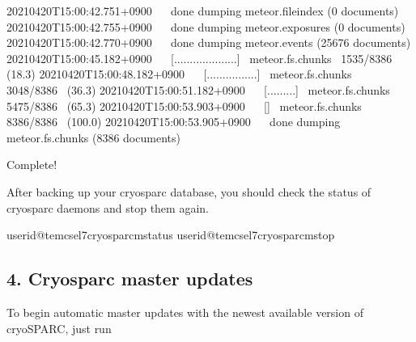 \documentclass[a4paper,10pt,english]{sphinxmanual}
\begin{document}
\begin{sphinxVerbatim}[commandchars=\\\{\}]
2021\PYGZhy{}04\PYGZhy{}20T15:00:42.751+0900    done dumping meteor.file\PYGZus{}index (0 documents)
2021\PYGZhy{}04\PYGZhy{}20T15:00:42.755+0900    done dumping meteor.exposures (0 documents)
2021\PYGZhy{}04\PYGZhy{}20T15:00:42.770+0900    done dumping meteor.events (25676 documents)
2021\PYGZhy{}04\PYGZhy{}20T15:00:45.182+0900    [\PYGZsh{}\PYGZsh{}\PYGZsh{}\PYGZsh{}....................]  meteor.fs.chunks  1535/8386  (18.3\PYGZpc{})
2021\PYGZhy{}04\PYGZhy{}20T15:00:48.182+0900    [\PYGZsh{}\PYGZsh{}\PYGZsh{}\PYGZsh{}\PYGZsh{}\PYGZsh{}\PYGZsh{}\PYGZsh{}................]  meteor.fs.chunks  3048/8386  (36.3\PYGZpc{})
2021\PYGZhy{}04\PYGZhy{}20T15:00:51.182+0900    [\PYGZsh{}\PYGZsh{}\PYGZsh{}\PYGZsh{}\PYGZsh{}\PYGZsh{}\PYGZsh{}\PYGZsh{}\PYGZsh{}\PYGZsh{}\PYGZsh{}\PYGZsh{}\PYGZsh{}\PYGZsh{}\PYGZsh{}.........]  meteor.fs.chunks  5475/8386  (65.3\PYGZpc{})
2021\PYGZhy{}04\PYGZhy{}20T15:00:53.903+0900    [\PYGZsh{}\PYGZsh{}\PYGZsh{}\PYGZsh{}\PYGZsh{}\PYGZsh{}\PYGZsh{}\PYGZsh{}\PYGZsh{}\PYGZsh{}\PYGZsh{}\PYGZsh{}\PYGZsh{}\PYGZsh{}\PYGZsh{}\PYGZsh{}\PYGZsh{}\PYGZsh{}\PYGZsh{}\PYGZsh{}\PYGZsh{}\PYGZsh{}\PYGZsh{}\PYGZsh{}]  meteor.fs.chunks  8386/8386  (100.0\PYGZpc{})
2021\PYGZhy{}04\PYGZhy{}20T15:00:53.905+0900    done dumping meteor.fs.chunks (8386 documents)

Complete!
\end{sphinxVerbatim}

\sphinxAtStartPar
After backing up your cryosparc database, you should check the status of cryosparc daemons and stop them again.

\begin{sphinxVerbatim}[commandchars=\\\{\}]
userid@tem\PYGZhy{}cs\PYGZhy{}el7\PYGZdl{}\PYGZgt{}cryosparcmstatus
userid@tem\PYGZhy{}cs\PYGZhy{}el7\PYGZdl{}\PYGZgt{}cryosparcmstop
\end{sphinxVerbatim}


\subsection{4. Cryosparc master updates}
\label{\detokenize{faq:cryosparc-master-updates}}
\sphinxAtStartPar
To begin automatic master updates with the newest available version of cryoSPARC, just run
\end{document}
